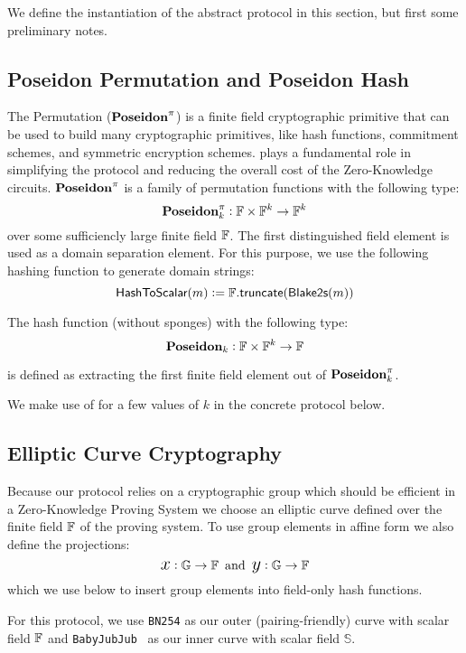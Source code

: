 
We define the instantiation of the abstract protocol in this section, but first some preliminary notes.
 
\subsection{Poseidon Permutation and Poseidon Hash}
 
The \Poseidon{} Permutation (${\textbf{Poseidon}}^{\pi}$) \cite{KRRS21USENIX} is a finite field cryptographic primitive that can be used to build many cryptographic primitives, like hash functions, commitment schemes, and symmetric encryption schemes. \Poseidon{} plays a fundamental role in simplifying the \Transfer{} protocol and reducing the overall cost of the Zero-Knowledge circuits. ${\textbf{Poseidon}}^{\pi}$ is a family of permutation functions with the following type:
\[{\textbf{Poseidon}}^{\pi}_k : {\mathbb{F}} \times {\mathbb{F}}^k \to {\mathbb{F}}^k\]
over some sufficiencly large finite field ${\mathbb{F}}$. The first distinguished field element is used as a domain separation element. For this purpose, we use the following hashing function to generate domain strings:
\[{\textsf{HashToScalar}}(m) := {\mathbb{F}}.{\textsf{truncate}}(\textsf{Blake2s}(m))\]
 
The \Poseidon{} hash function (without sponges) with the following type:
\[{\textbf{Poseidon}}_k : {\mathbb{F}} \times {\mathbb{F}}^k \to {\mathbb{F}}\]

is defined as extracting the first finite field element out of ${\textbf{Poseidon}}^{\pi}_k$.
 
We make use of \Poseidon{} for a few values of $k$ in the concrete protocol below.

\subsection{Elliptic Curve Cryptography}

Because our protocol relies on a cryptographic group which should be efficient in a Zero-Knowledge Proving System we choose an elliptic curve defined over the finite field ${\mathbb{F}}$ of the proving system. To use group elements in affine form we also define the projections:
\[{\text{\Large $x$}} : {\mathbb{G}} \to {\mathbb{F}} \,\,\,\text{and}\,\,\, {\text{\Large $y$}} : {\mathbb{G}} \to {\mathbb{F}}\]
which we use below to insert group elements into field-only hash functions.
 
For this protocol, we use \texttt{BN254} as our outer (pairing-friendly) curve with scalar field ${\mathbb{F}}$ and \texttt{BabyJubJub}~\cite{eip2494} as our inner curve with scalar field $\mathbb{S}$.
 
